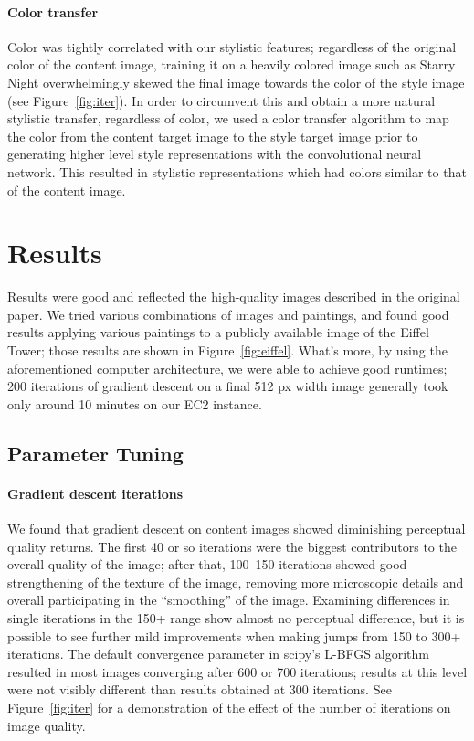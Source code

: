 \documentclass[11pt,letterpaper,journal]{IEEEtran}
\begin{document}
\paragraph{Color transfer}

Color was tightly correlated with our stylistic
features; regardless of the original color of the content image, training it on
a heavily colored image such as Starry Night overwhelmingly skewed the final
image towards the color of the style image (see Figure~\ref{fig:iter}).
In order to circumvent this and obtain a more natural stylistic transfer,
regardless of color, we used a color transfer algorithm \cite{reinhard2001color} to
map the color from the content target image to the style target image prior to
generating higher level style representations with the convolutional neural
network. This resulted in stylistic representations which had colors similar to
that of the content image.

\section{Results}

Results were good and reflected the high-quality images described in the
original paper. We tried various combinations of images and paintings, and
found good results applying various paintings to a publicly available image of
the Eiffel Tower; those results are shown in Figure~\ref{fig:eiffel}. What's
more, by using the aforementioned computer architecture, we were able to
achieve good runtimes; 200 iterations of gradient descent on a final 512 px
width image generally took only around 10 minutes on our EC2 instance.

\subsection{Parameter Tuning}

\paragraph{Gradient descent iterations}

We found that gradient descent on content images showed diminishing perceptual
quality returns. The first 40 or so iterations were the biggest contributors to
the overall quality of the image; after that, 100--150 iterations showed good
strengthening of the texture of the image, removing more microscopic details
and overall participating in the ``smoothing'' of the image. Examining
differences in single iterations in the 150+ range show almost no perceptual
difference, but it is possible to see further mild improvements when making
jumps from 150 to 300+ iterations. The default convergence parameter in scipy's
L-BFGS algorithm resulted in most images converging after 600 or 700
iterations; results at this level were not visibly different than results
obtained at 300 iterations. See Figure~\ref{fig:iter} for a demonstration of
the effect of the number of iterations on image quality.
\end{document}
